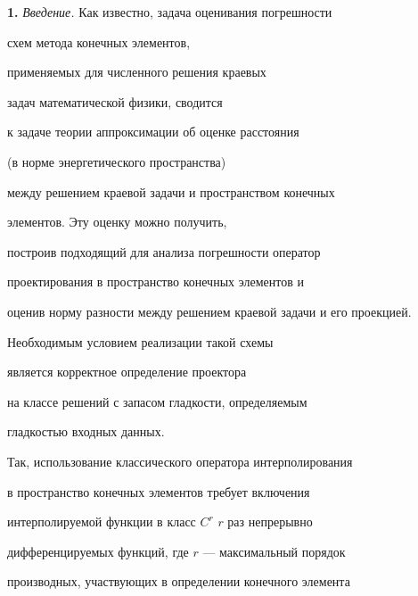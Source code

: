 \date{}




\pagestyle{plain} %







\maketitle


\label{begin}





{\bf 1.} {\it  Введение.} Как известно, задача оценивания погрешности 


схем метода конечных элементов, 


применяемых для численного решения краевых 


задач математической физики, сводится 


к задаче теории аппроксимации об оценке расстояния 


(в норме энергетического пространства) 


между решением краевой задачи и пространством конечных 


элементов. Эту оценку можно получить, 


построив подходящий для анализа погрешности оператор 


проектирования в пространство конечных элементов и 


оценив норму разности между решением краевой задачи и его проекцией.


Необходимым условием реализации такой схемы 


является корректное определение проектора 


на классе решений с запасом гладкости, определяемым 


гладкостью входных данных. 


Так, использование классического оператора интерполирования 


в пространство конечных элементов требует включения 


интерполируемой функции в класс $C^r$\; $r$ раз непрерывно 


дифференцируемых функций, где $r$ --- максимальный порядок 


производных, участвующих в определении конечного элемента 



